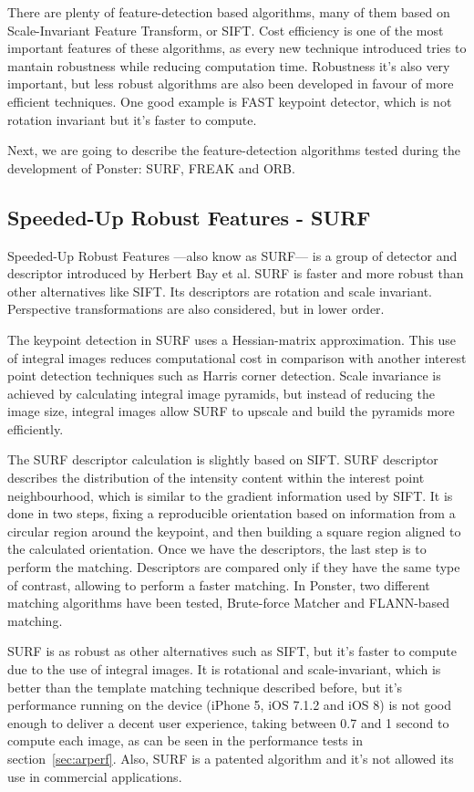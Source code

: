 There are plenty of feature-detection based algorithms, many of them based on
Scale-Invariant Feature Transform, or SIFT. Cost efficiency is one of the most
important features of these algorithms, as every new technique introduced tries to
mantain robustness while reducing computation time. Robustness it's also very
important, but less robust algorithms are also been developed in favour of more
efficient techniques. One good example is FAST\cite{6126544} keypoint detector, which is
not rotation invariant but it's faster to compute.

Next, we are going to describe the feature-detection algorithms tested during the
development of Ponster: SURF, FREAK and ORB.

\subsection{Speeded-Up Robust Features - SURF}
Speeded-Up Robust Features ---also know as SURF--- is a group of detector and descriptor
introduced by Herbert Bay et al. SURF is faster and more robust than other
alternatives like SIFT\cite{Bay:2008:SRF:1370312.1370556}. Its descriptors are
rotation and scale invariant. Perspective transformations are also considered, but
in lower order.  

The keypoint detection in SURF uses a Hessian-matrix approximation. This use of
integral images reduces computational cost in comparison with another interest point
detection techniques such as Harris corner detection. Scale invariance is achieved
by calculating integral image pyramids, but instead of reducing the image size,
integral images allow SURF to upscale and build the pyramids more efficiently. 

The SURF descriptor calculation is slightly based on SIFT. SURF descriptor describes
the distribution of the intensity content within the interest point neighbourhood,
which is similar to the gradient information used by SIFT. It is done in two steps,
fixing a reproducible orientation based on information from a circular region around
the keypoint, and then building a square region aligned to the calculated
orientation. Once we have the descriptors, the last step is to perform the
matching. Descriptors are compared only if they have the same type of contrast,
allowing to perform a faster matching. In Ponster, two different matching algorithms
have been tested, Brute-force Matcher and FLANN-based matching.

SURF is as robust as other alternatives such as SIFT, but it's faster to compute due
to the use of integral images. It is rotational and scale-invariant, which is better
than the template matching technique described before, but it's performance running
on the device (iPhone 5, iOS 7.1.2 and iOS 8) is not good enough to deliver a decent user
experience, taking between 0.7 and 1 second to compute each image, as can be
seen in the performance tests in section~\ref{sec:arperf}. Also, SURF is a
patented algorithm and it's not allowed its use in commercial applications. 

